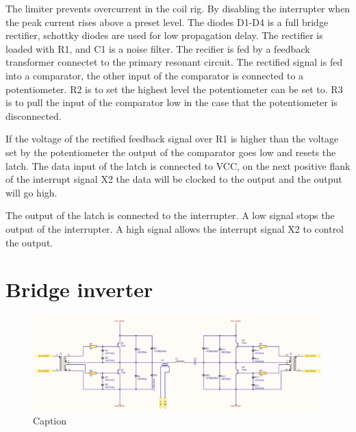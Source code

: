 The limiter prevents overcurrent in the coil rig. By disabling the interrupter when the peak current rises above a preset level. The diodes D1-D4 is a full bridge rectifier, schottky diodes are used for low propagation delay. The rectifier is loaded with R1, and C1 is a noise filter. The recifier is fed by a feedback transformer connectet to the primary resonant circuit. The rectified signal is fed into a comparator, the other input of the comparator is connected to a potentiometer. R2 is to set the highest level the potentiometer can be set to. R3 is to pull the input of the comparator low in the case that the potentiometer is disconnected.

If the voltage of the rectified feedback signal over R1 is higher than the voltage set by the potentiometer the output of the comparator goes low and resets the latch. The data input of the latch is connected to VCC, on the next positive flank of the interrupt signal X2 the data will be clocked to the output and the output will go high.

The output of the latch is connected to the interrupter. A low signal stops the output of the interrupter. A high signal allows the interrupt signal X2 to control the output.



\section{Bridge inverter}

\begin{figure}[h!]
    \centering
    \includegraphics[width=\textwidth]{Skjema/TK531_Utgangstrinn_r.pdf}
    \caption{Caption}
    \label{fig:tk531}
\end{figure}

